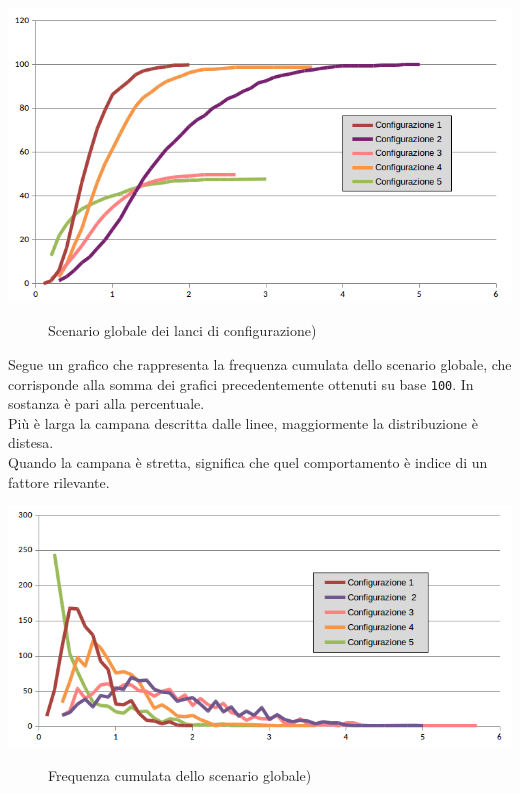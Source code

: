 \begin{center}
\includegraphics[scale=0.70]{img/comparison_tot1.png}
\end{center}
\begin{figure}[htbp]
\caption{Scenario globale dei lanci di configurazione) \label{figura1.15}}
\end{figure}

Segue un grafico che rappresenta la frequenza cumulata dello scenario globale, che corrisponde alla somma dei grafici precedentemente ottenuti su base \verb"100". In sostanza \`{e} pari alla percentuale.\\
Pi\`{u} \`{e} larga la campana descritta dalle linee, maggiormente la distribuzione \`{e} distesa.\\
Quando la campana \`{e} stretta, significa che quel comportamento \`{e} indice di un fattore rilevante.

\begin{center}
\includegraphics[scale=0.70]{img/comparison_tot2.png}
\end{center}
\begin{figure}[htbp]
\caption{Frequenza cumulata dello scenario globale) \label{figura1.15}}
\end{figure}

